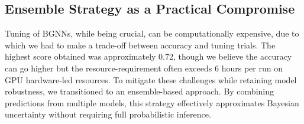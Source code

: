 \documentclass[11pt,a4paper]{article}
\begin{document}
\subsection{Ensemble Strategy as a Practical Compromise}

Tuning of BGNNs, while being crucial, can be computationally expensive, due to which we had to make a trade-off between accuracy and tuning trials. The highest score obtained was approximately 0.72, though we believe the accuracy can go higher but the resource-requirement often exceeds 6 hours per run on GPU hardware-led resources.
To mitigate these challenges while retaining model robustness, we transitioned to an ensemble-based approach. By combining predictions from multiple models, this strategy effectively approximates Bayesian uncertainty without requiring full probabilistic inference.
\end{document}
